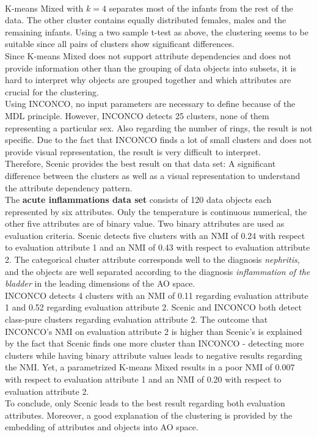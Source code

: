 \documentclass[conference]{IEEEtran}
\begin{document}
\\
K-means Mixed with $k = 4$ separates most of the infants from the rest of the data. The other cluster contains equally distributed females, males and the remaining infants. Using a two sample t-test as above, the clustering seems to be suitable since all pairs of clusters show significant differences.
\\
Since K-means Mixed does not support attribute dependencies and does not provide information other than the grouping of data objects into subsets, it is hard to interpret why objects are grouped together and which attributes are crucial for the clustering.
\\
Using INCONCO, no input parameters are necessary to define because of the MDL principle. However, INCONCO detects 25 clusters, none of them representing a particular sex. Also regarding the number of rings, the result is not specific. Due to the fact that INCONCO finds a lot of small clusters and does not provide visual representation, the result is very difficult to interpret. 
\\Therefore, Scenic provides the best result on that data set: A significant difference between the clusters as well as a visual representation to understand the attribute dependency pattern.
\\
The \textbf{acute inflammations data set} consists of 120 data objects each represented by six attributes. Only the temperature is continuous numerical, the other five attributes are of binary value. Two binary attributes are used as evaluation criteria. Scenic detects five clusters with an NMI of 0.24 with respect to evaluation attribute 1 and an NMI of 0.43 with respect to evaluation attribute 2. The categorical cluster attribute corresponds well to the diagnosis \textit{nephritis}, and the objects are well separated according to the diagnosis \textit{inflammation of the bladder} in the leading dimensions of the AO space.
\\
INCONCO detects 4 clusters with an NMI of 0.11 regarding evaluation attribute 1 and 0.52 regarding evaluation attribute 2. Scenic and INCONCO both detect class-pure clusters regarding evaluation attribute 2. The outcome that INCONCO's NMI on evaluation attribute 2 is higher than Scenic's is explained by the fact that Scenic finds one more cluster than INCONCO - detecting more clusters while having binary attribute values leads to negative results regarding the NMI.
Yet, a parametrized K-means Mixed results in a poor NMI of 0.007 with respect to evaluation attribute 1 and an NMI of 0.20 with respect to evaluation attribute 2.
\\
To conclude, only Scenic leads to the best result regarding both evaluation attributes. Moreover, a good explanation of the clustering is provided by the embedding of attributes and objects into AO space.
\end{document}
